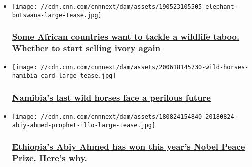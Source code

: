 \begin{itemize}
\item
  \href{/2019/08/24/africa/elephant-ivory-mckenzie-analysis-intl/index.html}{}

  \texttt{[image: //cdn.cnn.com/cnnnext/dam/assets/190523105505-elephant-botswana-large-tease.jpg]}

  \hypertarget{some-african-countries-want-to-tackle-a-wildlife-taboo-whether-to-start-selling-ivory-again}{%
  \subsubsection{\texorpdfstring{\href{/2019/08/24/africa/elephant-ivory-mckenzie-analysis-intl/index.html}{Some
  African countries want to tackle a wildlife taboo. Whether to start
  selling ivory
  again}}{Some African countries want to tackle a wildlife taboo. Whether to start selling ivory again}}\label{some-african-countries-want-to-tackle-a-wildlife-taboo-whether-to-start-selling-ivory-again}}
\end{itemize}

\begin{itemize}
\item
  \href{/travel/article/namibia-wild-horses-spc-intl/index.html}{}

  \texttt{[image: //cdn.cnn.com/cnnnext/dam/assets/200618145730-wild-horses-namibia-card-large-tease.jpg]}

  \hypertarget{namibias-last-wild-horses-face-a-perilous-future}{%
  \subsubsection{\texorpdfstring{\href{/travel/article/namibia-wild-horses-spc-intl/index.html}{Namibia's
  last wild horses face a perilous
  future}}{Namibia's last wild horses face a perilous future}}\label{namibias-last-wild-horses-face-a-perilous-future}}
\end{itemize}

\begin{itemize}
\item
  \href{/2019/10/10/africa/abiy-ahmed-ethiopia-nobel-peace-prize-2019/index.html}{}

  \texttt{[image: //cdn.cnn.com/cnnnext/dam/assets/180824154840-20180824-abiy-ahmed-prophet-illo-large-tease.jpg]}

  \hypertarget{ethiopias-abiy-ahmed-has-won-this-years-nobel-peace-prize-heres-why}{%
  \subsubsection{\texorpdfstring{\href{/2019/10/10/africa/abiy-ahmed-ethiopia-nobel-peace-prize-2019/index.html}{Ethiopia's
  Abiy Ahmed has won this year's Nobel Peace Prize. Here's
  why.}}{Ethiopia's Abiy Ahmed has won this year's Nobel Peace Prize. Here's why.}}\label{ethiopias-abiy-ahmed-has-won-this-years-nobel-peace-prize-heres-why}}
\end{itemize}


